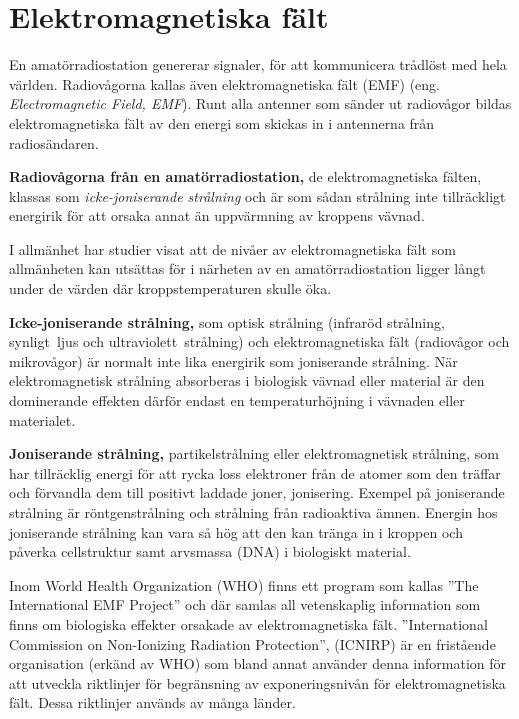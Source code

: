 \chapter{Elektromagnetiska fält}
\label{ch:EMF}
En amatörradiostation genererar signaler, för att kommunicera trådlöst med hela
världen.
Radiovågorna kallas även elektromagnetiska fält (EMF)
(eng. \emph{Electromagnetic Field, EMF}).
Runt alla antenner som sänder ut radiovågor bildas elektromagnetiska fält av den
energi som skickas in i antennerna från radiosändaren.

\textbf{Radiovågorna från en amatörradiostation,} de elektro\-magnetiska fälten, klassas
som \emph{icke-joniserande strålning} och är som sådan strålning inte
tillräckligt energirik för att orsaka annat än uppvärmning av kroppens vävnad.

I allmänhet har studier visat att de nivåer av elektromagnetiska fält som
allmänheten kan utsättas för i närheten av en amatörradiostation ligger långt
under de värden där kroppstemperaturen skulle öka.

\textbf{Icke-joniserande strålning,} som optisk strålning (infraröd strålning,
synligt~ljus och ultraviolett~strålning) och elektromagnetiska fält (radiovågor
och mikrovågor) är normalt inte lika energirik som joniserande strålning.
När elektromagnetisk strålning absorberas i biologisk vävnad eller material är
den dominerande effekten därför endast en temperaturhöjning i vävnaden eller
materialet.

\textbf{Joniserande strålning,} partikelstrålning eller elektromagnetisk strålning, som
har tillräcklig energi för att rycka loss elektroner från de atomer som den
träffar och förvandla dem till positivt laddade joner, jonisering.
Exempel på joniserande strålning är röntgenstrålning och strålning från
radioaktiva ämnen.
Energin hos joniserande strålning kan vara så hög att den kan tränga in i
kroppen och påverka cellstruktur samt arvsmassa (DNA) i biologiskt material.

Inom World Health Organization (WHO) finns ett program som kallas
''The International EMF Project'' och där samlas all vetenskaplig
information som finns om biologiska effekter orsakade av elektromagnetiska fält.
''International Commission on Non-Ionizing Radiation Protection'', (ICNIRP)
är en fristående organisation (erkänd av WHO) som bland annat använder denna
information för att utveckla riktlinjer för begränsning av exponeringsnivån för
elektromagnetiska fält.
Dessa riktlinjer används av många länder.

